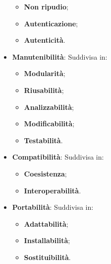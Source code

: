 \begin{itemize}
\begin{itemize}
		\item \textbf{Non ripudio};
		\item \textbf{Autenticazione};
		\item \textbf{Autenticità}.
	\end{itemize}
	\item \textbf{Manutenibilità}: Suddivisa in:
	\begin{itemize}
		\item \textbf{Modularità};
		\item \textbf{Riusabilità};
		\item \textbf{Analizzabilità};
		\item \textbf{Modificabilità};
		\item \textbf{Testabilità}.
	\end{itemize}
	\item \textbf{Compatibilità}: Suddivisa in:
	\begin{itemize}
		\item \textbf{Coesistenza};
		\item \textbf{Interoperabilità}.
	\end{itemize}
	\item \textbf{Portabilità}: Suddivisa in:
	\begin{itemize}
		\item \textbf{Adattabilità};
		\item \textbf{Installabilità};
		\item \textbf{Sostituibilità}.
	\end{itemize}
\end{itemize}
